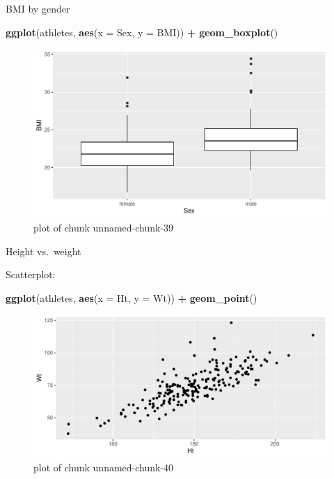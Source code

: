 \documentclass[ignorenonframetext,]{beamer}
\newenvironment{Shaded}{\begin{snugshade}}{\end{snugshade}}
\newcommand{\DataTypeTok}[1]{\textcolor[rgb]{0.13,0.29,0.53}{#1}}
\newcommand{\KeywordTok}[1]{\textcolor[rgb]{0.13,0.29,0.53}{\textbf{#1}}}
\newcommand{\NormalTok}[1]{#1}
\newcommand{\OperatorTok}[1]{\textcolor[rgb]{0.81,0.36,0.00}{\textbf{#1}}}
\newcommand{\StringTok}[1]{\textcolor[rgb]{0.31,0.60,0.02}{#1}}
\begin{document}
\begin{frame}[fragile]{BMI by gender}
\protect\hypertarget{bmi-by-gender}{}

\begin{Shaded}
\begin{Highlighting}[]
\KeywordTok{ggplot}\NormalTok{(athletes, }\KeywordTok{aes}\NormalTok{(}\DataTypeTok{x =}\NormalTok{ Sex, }\DataTypeTok{y =}\NormalTok{ BMI)) }\OperatorTok{+}\StringTok{ }\KeywordTok{geom_boxplot}\NormalTok{()}
\end{Highlighting}
\end{Shaded}

\begin{figure}
\centering
\includegraphics{figure/unnamed-chunk-39-1.pdf}
\caption{plot of chunk unnamed-chunk-39}
\end{figure}

\end{frame}

\begin{frame}[fragile]{Height vs.~weight}
\protect\hypertarget{height-vs.weight}{}

Scatterplot:

\begin{Shaded}
\begin{Highlighting}[]
\KeywordTok{ggplot}\NormalTok{(athletes, }\KeywordTok{aes}\NormalTok{(}\DataTypeTok{x =}\NormalTok{ Ht, }\DataTypeTok{y =}\NormalTok{ Wt)) }\OperatorTok{+}\StringTok{ }\KeywordTok{geom_point}\NormalTok{()}
\end{Highlighting}
\end{Shaded}

\begin{figure}
\centering
\includegraphics{figure/unnamed-chunk-40-1.pdf}
\caption{plot of chunk unnamed-chunk-40}
\end{figure}

\end{frame}
\end{document}
